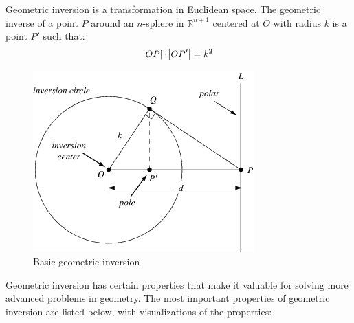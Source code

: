 \documentclass[a4paper,12pt]{article}
\numberwithin{figure}{section}
\begin{document}
        Geometric inversion is a transformation in Euclidean space. The geometric inverse of a point $P$ around an $n$-sphere in $\mathbb{R}^{n+1}$ centered at $O$ with radius $k$ is a point $P'$ such that:
        \[\abs{OP} \cdot \abs{OP'} = k^2\]
        \begin{figure}[H]
            \centering
            \includegraphics[scale=0.9]{./pictures/InversePoints}
            \caption{Basic geometric inversion}
            \label{fig:basic}
        \end{figure}
        
        Geometric inversion has certain properties that make it valuable for solving more advanced problems in geometry. The most important properties of geometric inversion are listed below, with visualizations of the properties:
        
\end{document}
